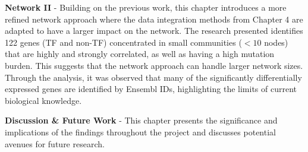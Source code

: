 \textbf{Network II} - Building on the previous work, this chapter introduces a more refined network approach where the data integration methods from Chapter 4 are adapted to have a larger impact on the network. The research presented identifies 122 genes (TF and non-TF) concentrated in small communities (\(<10\) nodes) that are highly and strongly correlated, as well as having a high mutation burden. This suggests that the network approach can handle larger network sizes. Through the analysis, it was observed that many of the significantly differentially expressed genes are identified by Ensembl IDs, highlighting the limits of current biological knowledge.


\textbf{Discussion \& Future Work} - This chapter presents the significance and implications of the findings throughout the project and discusses potential avenues for future research.
